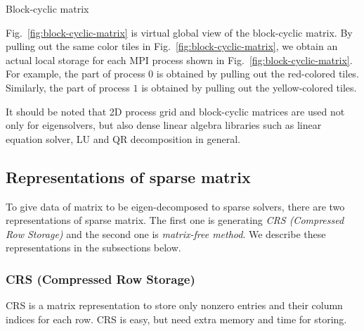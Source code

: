 \documentclass[12pt]{article}
\newcommand\figref[1]{Fig.~\ref{#1}}
\begin{document}
\begin{minipage}[c]{.5\linewidth}
\centering\drawblockcyclicglobal
{}\label{subfig:global-view}
\end{minipage}%
\begin{minipage}[c]{.5\linewidth}
\centering\drawblockcycliclocal
{}\label{subfig:local-view}
\end{minipage}
\caption{Block-cyclic matrix}\label{fig:block-cyclic-matrix}



\figref{fig:block-cyclic-matrix} is virtual global view of the block-cyclic matrix.
By pulling out the same color tiles in \figref{fig:block-cyclic-matrix},
we obtain an actual local storage for each MPI process shown in \figref{fig:block-cyclic-matrix}.
For example, the part of process $0$ is obtained by pulling out the red-colored tiles.
Similarly, the part of process $1$ is obtained by pulling out the yellow-colored tiles.

It should be noted that 2D process grid and block-cyclic matrices are used not only for eigensolvers, but also dense linear algebra libraries such as linear equation solver, LU and QR decomposition in general.

\subsection{Representations of sparse matrix}

To give data of matrix to be eigen-decomposed to sparse solvers, there are two representations of sparse matrix.
The first one is generating \emph{CRS (Compressed Row Storage)} and the second one is \emph{matrix-free method}.
We describe these representations in the subsections below.

\subsubsection{CRS (Compressed Row Storage)}

CRS is a matrix representation to store only nonzero entries and their column indices for each row.
CRS is easy, but need extra memory and time for storing.
\end{document}
